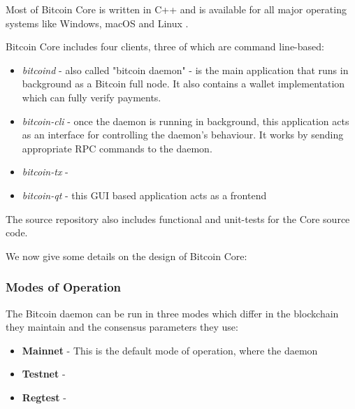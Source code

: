 

Most of Bitcoin Core is written in C++ and is available for all major operating systems like Windows, macOS and Linux \cite{bitcoinDownload}. 

Bitcoin Core includes four clients, three of which are command line-based: 

\begin{itemize}
    \item \textit{bitcoind} - also called "bitcoin daemon" - is the main application that runs in background as a Bitcoin full node. It also contains a wallet implementation which can fully verify payments.

    \item \textit{bitcoin-cli} - once the daemon is running in background, this application acts as an interface for controlling the daemon's behaviour. It works by sending appropriate RPC commands to the daemon.

    \item \textit{bitcoin-tx} - 

    \item \textit{bitcoin-qt} - this GUI based application acts as a frontend 
\end{itemize}

The source repository also includes functional and unit-tests for the Core source code.

We now give some details on the design of Bitcoin Core:

\subsubsection{Modes of Operation} \label{btc-modes}

The Bitcoin daemon can be run in three modes which differ in the blockchain they maintain and the consensus parameters they use:

\begin{itemize}
    \item \textbf{Mainnet} - This is the default mode of operation, where the daemon 
    \item \textbf{Testnet} - 
    \item \textbf{Regtest} - 
\end{itemize}

